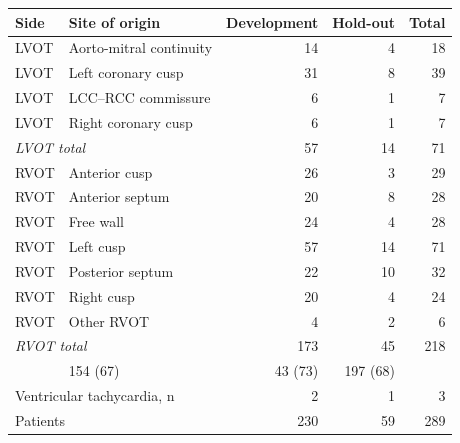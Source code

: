 \begin{tabular}{llrrr}
\toprule
Side & Site of origin & Development & Hold-out & Total \\
\midrule
LVOT & Aorto-mitral continuity & 14 & 4 & 18 \\
LVOT & Left coronary cusp & 31 & 8 & 39 \\
LVOT & LCC--RCC commissure & 6 & 1 & 7 \\
LVOT & Right coronary cusp & 6 & 1 & 7 \\
\multicolumn{2}{l}{\textit{LVOT total}} & 57 & 14 & 71 \\
\addlinespace
RVOT & Anterior cusp & 26 & 3 & 29 \\
RVOT & Anterior septum & 20 & 8 & 28 \\
RVOT & Free wall & 24 & 4 & 28 \\
RVOT & Left cusp & 57 & 14 & 71 \\
RVOT & Posterior septum & 22 & 10 & 32 \\
RVOT & Right cusp & 20 & 4 & 24 \\
RVOT & Other RVOT & 4 & 2 & 6 \\
\multicolumn{2}{l}{\textit{RVOT total}} & 173 & 45 & 218 \\
\addlinespace
\multicolumn{2}{l}{Female, n (\%)} & 154 (67) & 43 (73) & 197 (68) \\
\multicolumn{2}{l}{Ventricular tachycardia, n} & 2 & 1 & 3 \\
\midrule
\multicolumn{2}{l}{Patients} & 230 & 59 & 289 \\
\bottomrule
\end{tabular}
